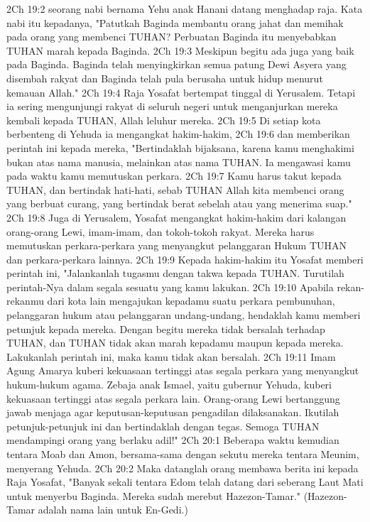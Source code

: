 2Ch 19:2  seorang nabi bernama Yehu anak Hanani datang menghadap raja. Kata nabi itu kepadanya, "Patutkah Baginda membantu orang jahat dan memihak pada orang yang membenci TUHAN? Perbuatan Baginda itu menyebabkan TUHAN marah kepada Baginda.
2Ch 19:3  Meskipun begitu ada juga yang baik pada Baginda. Baginda telah menyingkirkan semua patung Dewi Asyera yang disembah rakyat dan Baginda telah pula berusaha untuk hidup menurut kemauan Allah."
2Ch 19:4  Raja Yosafat bertempat tinggal di Yerusalem. Tetapi ia sering mengunjungi rakyat di seluruh negeri untuk menganjurkan mereka kembali kepada TUHAN, Allah leluhur mereka.
2Ch 19:5  Di setiap kota berbenteng di Yehuda ia mengangkat hakim-hakim,
2Ch 19:6  dan memberikan perintah ini kepada mereka, "Bertindaklah bijaksana, karena kamu menghakimi bukan atas nama manusia, melainkan atas nama TUHAN. Ia mengawasi kamu pada waktu kamu memutuskan perkara.
2Ch 19:7  Kamu harus takut kepada TUHAN, dan bertindak hati-hati, sebab TUHAN Allah kita membenci orang yang berbuat curang, yang bertindak berat sebelah atau yang menerima suap."
2Ch 19:8  Juga di Yerusalem, Yosafat mengangkat hakim-hakim dari kalangan orang-orang Lewi, imam-imam, dan tokoh-tokoh rakyat. Mereka harus memutuskan perkara-perkara yang menyangkut pelanggaran Hukum TUHAN dan perkara-perkara lainnya.
2Ch 19:9  Kepada hakim-hakim itu Yosafat memberi perintah ini, "Jalankanlah tugasmu dengan takwa kepada TUHAN. Turutilah perintah-Nya dalam segala sesuatu yang kamu lakukan.
2Ch 19:10  Apabila rekan-rekanmu dari kota lain mengajukan kepadamu suatu perkara pembunuhan, pelanggaran hukum atau pelanggaran undang-undang, hendaklah kamu memberi petunjuk kepada mereka. Dengan begitu mereka tidak bersalah terhadap TUHAN, dan TUHAN tidak akan marah kepadamu maupun kepada mereka. Lakukanlah perintah ini, maka kamu tidak akan bersalah.
2Ch 19:11  Imam Agung Amarya kuberi kekuasaan tertinggi atas segala perkara yang menyangkut hukum-hukum agama. Zebaja anak Ismael, yaitu gubernur Yehuda, kuberi kekuasaan tertinggi atas segala perkara lain. Orang-orang Lewi bertanggung jawab menjaga agar keputusan-keputusan pengadilan dilaksanakan. Ikutilah petunjuk-petunjuk ini dan bertindaklah dengan tegas. Semoga TUHAN mendampingi orang yang berlaku adil!"
2Ch 20:1  Beberapa waktu kemudian tentara Moab dan Amon, bersama-sama dengan sekutu mereka tentara Meunim, menyerang Yehuda.
2Ch 20:2  Maka datanglah orang membawa berita ini kepada Raja Yosafat, "Banyak sekali tentara Edom telah datang dari seberang Laut Mati untuk menyerbu Baginda. Mereka sudah merebut Hazezon-Tamar." (Hazezon-Tamar adalah nama lain untuk En-Gedi.)
